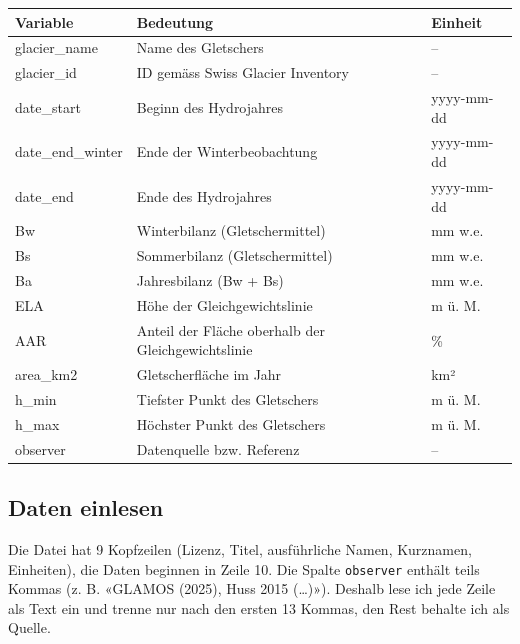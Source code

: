 \documentclass[
  nswissgerman,
  11pt,
  a4paper,
  DIV=11,
  numbers=noendperiod]{scrartcl}
\newcounter{none} %
\begin{document}
{\def\LTcaptype{none} %
\begin{longtable}[]{@{}
  >{\raggedright\arraybackslash}p{}
  >{\raggedright\arraybackslash}p{}
  >{\raggedright\arraybackslash}p{}@{}}
\toprule\noalign{}
\begin{minipage}[b]{\linewidth}\raggedright
Variable
\end{minipage} & \begin{minipage}[b]{\linewidth}\raggedright
Bedeutung
\end{minipage} & \begin{minipage}[b]{\linewidth}\raggedright
Einheit
\end{minipage} \\
\midrule\noalign{}
\endhead
\bottomrule\noalign{}
\endlastfoot
glacier\_name & Name des Gletschers & -- \\
glacier\_id & ID gemäss Swiss Glacier Inventory & -- \\
date\_start & Beginn des Hydrojahres & yyyy-mm-dd \\
date\_end\_winter & Ende der Winterbeobachtung & yyyy-mm-dd \\
date\_end & Ende des Hydrojahres & yyyy-mm-dd \\
Bw & Winterbilanz (Gletschermittel) & mm w.e. \\
Bs & Sommerbilanz (Gletschermittel) & mm w.e. \\
Ba & Jahresbilanz (Bw + Bs) & mm w.e. \\
ELA & Höhe der Gleichgewichtslinie & m ü. M. \\
AAR & Anteil der Fläche oberhalb der Gleichgewichtslinie & \% \\
area\_km2 & Gletscherfläche im Jahr & km² \\
h\_min & Tiefster Punkt des Gletschers & m ü. M. \\
h\_max & Höchster Punkt des Gletschers & m ü. M. \\
observer & Datenquelle bzw. Referenz & -- \\
\end{longtable}
}

\subsection{Daten einlesen}\label{daten-einlesen}

Die Datei hat 9 Kopfzeilen (Lizenz, Titel, ausführliche Namen,
Kurznamen, Einheiten), die Daten beginnen in Zeile 10. Die Spalte
\texttt{observer} enthält teils Kommas (z. B. «GLAMOS (2025), Huss 2015
(\ldots)»). Deshalb lese ich jede Zeile als Text ein und trenne nur nach
den ersten 13 Kommas, den Rest behalte ich als Quelle.
\end{document}
